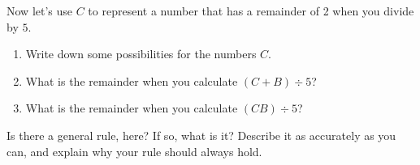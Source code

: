 \documentclass{ximera}
\begin{document}
\begin{problem}
Now let's use $C$ to represent a number that has a remainder of 2 when you divide by $5$.
\begin{enumerate}
\item  Write down some possibilities for the numbers $C$.
\item   What is the remainder when you calculate $(C + B) \div 5$?  
\item  What is the remainder when you calculate $(CB) \div 5$?
\end{enumerate}
\end{problem}

\begin{problem}
  Is there a general rule, here?  If so, what is it?  Describe it as accurately as you can, and explain why your rule should always hold.
\end{problem}


 
\end{document}
